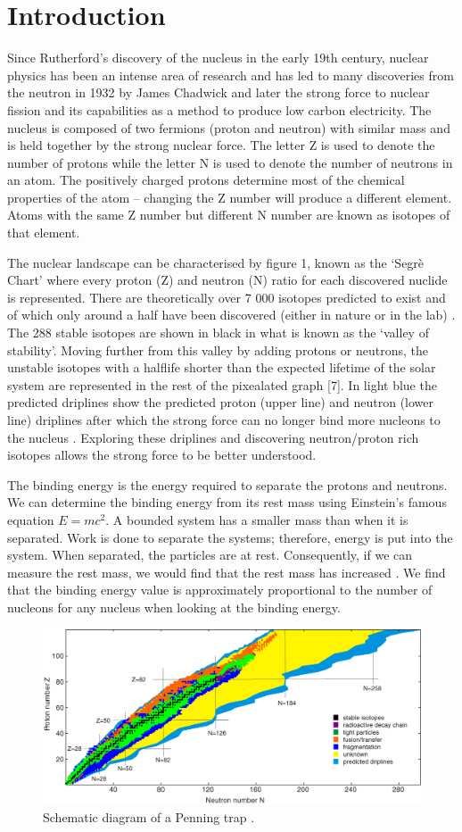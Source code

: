 \section{Introduction}
Since Rutherford’s discovery of the nucleus in the early 19th century,\cite{noauthor_discovery_nodate} nuclear physics has been an intense area of research and has led to many discoveries from the neutron in 1932 by James Chadwick \cite{noauthor_discovery_nodate-1} and later the strong force to nuclear fission and its capabilities as a method to produce low carbon electricity.
The nucleus is composed of two fermions (proton and neutron) with similar mass and is held together by the strong nuclear force.
The letter Z is used to denote the number of protons while the letter N is used to denote the number of neutrons in an atom. The positively charged protons determine most of the chemical properties of the atom – changing the Z number will produce a different element. Atoms with the same Z number but different N number are known as isotopes of that element.

The nuclear landscape can be characterised by figure 1, known as the ‘Segrè Chart’ where every proton (Z) and neutron (N) ratio for each discovered nuclide is represented.
There are theoretically over 7 000 isotopes predicted to exist and of which only around a half have been discovered (either in nature or in the lab) \cite{erler_limits_2012}.
The 288 stable isotopes are shown in black in what is known as the ‘valley of stability’.
Moving further from this valley by adding protons or neutrons, the unstable isotopes with a halflife shorter than the expected lifetime of the solar system are represented in the rest of the pixealated graph [7].
In light blue the predicted driplines show the predicted proton (upper line) and neutron (lower line) driplines after which the strong force can no longer bind more nucleons to the nucleus \cite{noauthor_amazing_nodate}.
Exploring these driplines and discovering neutron/proton rich isotopes allows the strong force to be better understood.

The binding energy is the energy required to separate the protons and neutrons.
We can determine the binding energy from its rest mass using Einstein’s famous equation $E=mc^2$.
A bounded system has a smaller mass than when it is separated.  Work is done to separate the systems; therefore, energy is put into the system.
When separated, the particles are at rest.
Consequently, if we can measure the rest mass, we would find that the rest mass has increased \cite{noauthor_binding_nodate}.
We find that the binding energy value is approximately proportional to the number of nucleons for any nucleus when looking at the binding energy.

\begin{figure}[H]
    \centering
    \includegraphics[width=.48\textwidth]{images/intro_nuclearlandscape.jpg}
    \caption{Schematic diagram of a Penning trap \cite{famiano_nuclear_2019}.}\label{fig:intronuclan}
\end{figure}